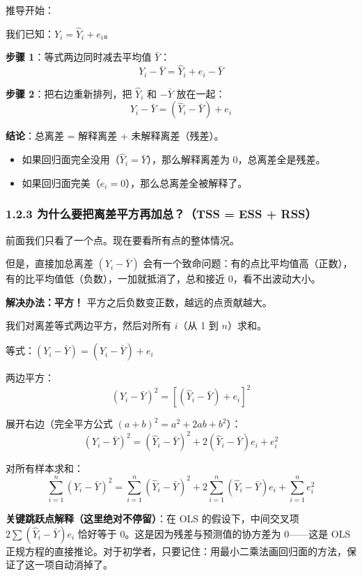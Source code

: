 \documentclass[12pt,a4paper]{ctexart}
\begin{document}
推导开始：

我们已知：\(Y_i = \hat{Y}_i + e_i\)。

\textbf{步骤 1}：等式两边同时减去平均值 \(\bar{Y}\)：
\[
Y_i - \bar{Y} = \hat{Y}_i + e_i - \bar{Y}
\]

\textbf{步骤 2}：把右边重新排列，把 \(\hat{Y}_i\) 和 \(-\bar{Y}\) 放在一起：
\begin{equation}
Y_i - \bar{Y} = (\hat{Y}_i - \bar{Y}) + e_i \tag{3.37}
\end{equation}

\textbf{结论}：总离差 = 解释离差 + 未解释离差（残差）。
\begin{itemize}
    \item 如果回归面完全没用（\(\hat{Y}_i = \bar{Y}\)），那么解释离差为 0，总离差全是残差。
    \item 如果回归面完美（\(e_i = 0\)），那么总离差全被解释了。
\end{itemize}

\subsubsection{1.2.3 为什么要把离差平方再加总？（TSS = ESS + RSS）}

前面我们只看了一个点。现在要看所有点的整体情况。

但是，直接加总离差 \((Y_i - \bar{Y})\) 会有一个致命问题：有的点比平均值高（正数），有的比平均值低（负数），一加就抵消了，总和接近 0，看不出波动大小。

\textbf{解决办法：平方！} 平方之后负数变正数，越远的点贡献越大。

我们对离差等式两边平方，然后对所有 \(i\)（从 1 到 \(n\)）求和。

等式：\((Y_i - \bar{Y}) = (\hat{Y}_i - \bar{Y}) + e_i\)

两边平方：
\[
(Y_i - \bar{Y})^2 = [(\hat{Y}_i - \bar{Y}) + e_i]^2
\]

展开右边（完全平方公式 \((a+b)^2 = a^2 + 2ab + b^2\)）：
\[
(Y_i - \bar{Y})^2 = (\hat{Y}_i - \bar{Y})^2 + 2(\hat{Y}_i - \bar{Y})e_i + e_i^2
\]

对所有样本求和：
\[
\sum_{i=1}^{n}(Y_i - \bar{Y})^2 = \sum_{i=1}^{n}(\hat{Y}_i - \bar{Y})^2 + 2\sum_{i=1}^{n}(\hat{Y}_i - \bar{Y})e_i + \sum_{i=1}^{n} e_i^2
\]

\textbf{关键跳跃点解释（这里绝对不停留）}：在 OLS 的假设下，中间交叉项 \(2\sum(\hat{Y}_i - \bar{Y})e_i\) 恰好等于 0。这是因为残差与预测值的协方差为 0——这是 OLS 正规方程的直接推论。对于初学者，只要记住：用最小二乘法画回归面的方法，保证了这一项自动消掉了。
\end{document}
